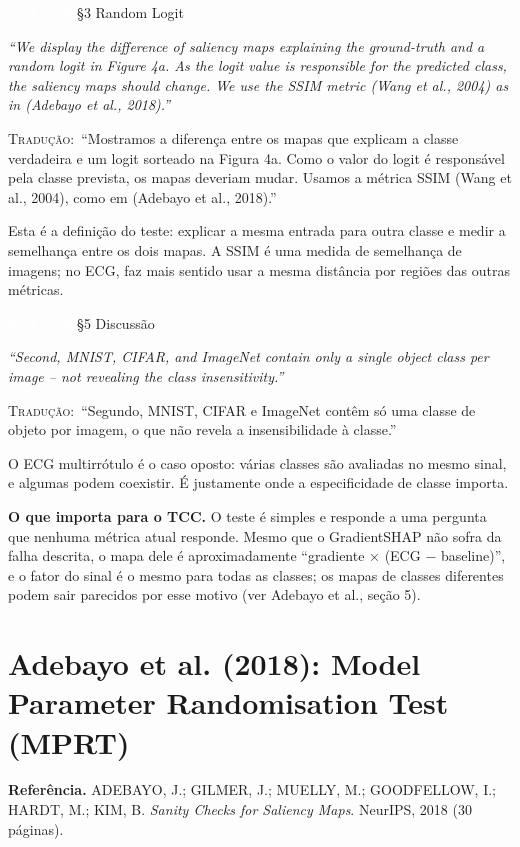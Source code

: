 \documentclass[11pt,a4paper]{article}
\newcommand{\pagechip}[1]{{\setlength{\fboxsep}{1.5pt}\colorbox{cAcc}{\textcolor{white}{\scriptsize\texttt{#1}}}}}
\newenvironment{origquote}{\par\itshape\small}{\par}
\newenvironment{tradquote}{\par\small\textsc{Tradução:}\ }{\par}
\newcommand{\explab}[1]{\par\smallskip{\small\color{cAcc}\textbf{\MakeUppercase{#1}}}\par}
\begin{document}
\begin{citacard}{\pagechip{Sixt p. 5} §3 Random Logit}
\begin{origquote}“We display the difference of saliency maps explaining the ground-truth and a random logit in Figure 4a. As the logit value is responsible for the predicted class, the saliency maps should change. We use the SSIM metric (Wang et al., 2004) as in (Adebayo et al., 2018).”\end{origquote}
\begin{tradquote}“Mostramos a diferença entre os mapas que explicam a classe verdadeira e um logit sorteado na Figura 4a. Como o valor do logit é responsável pela classe prevista, os mapas deveriam mudar. Usamos a métrica SSIM (Wang et al., 2004), como em (Adebayo et al., 2018).”\end{tradquote}
\explab{Explicação}
Esta é a definição do teste: explicar a mesma entrada para outra classe e medir a semelhança entre os dois mapas. A SSIM é uma medida de semelhança de imagens; no ECG, faz mais sentido usar a mesma distância por regiões das outras métricas.
\end{citacard}

\begin{citacard}{\pagechip{Sixt p. 6} §5 Discussão}
\begin{origquote}“Second, MNIST, CIFAR, and ImageNet contain only a single object class per image -- not revealing the class insensitivity.”\end{origquote}
\begin{tradquote}“Segundo, MNIST, CIFAR e ImageNet contêm só uma classe de objeto por imagem, o que não revela a insensibilidade à classe.”\end{tradquote}
\explab{Explicação}
O ECG multirrótulo é o caso oposto: várias classes são avaliadas no mesmo sinal, e algumas podem coexistir. É justamente onde a especificidade de classe importa.
\end{citacard}

\textbf{O que importa para o TCC.} O teste é simples e responde a uma pergunta que nenhuma métrica atual responde. Mesmo que o GradientSHAP não sofra da falha descrita, o mapa dele é aproximadamente “gradiente $\times$ (ECG $-$ baseline)”, e o fator do sinal é o mesmo para todas as classes; os mapas de classes diferentes podem sair parecidos por esse motivo (ver Adebayo et al., seção 5).

\section{Adebayo et al. (2018): Model Parameter Randomisation Test (MPRT)}
\textbf{Referência.} ADEBAYO, J.; GILMER, J.; MUELLY, M.; GOODFELLOW, I.; HARDT, M.; KIM, B. \textit{Sanity Checks for Saliency Maps}. NeurIPS, 2018 (30 páginas).
\end{document}
